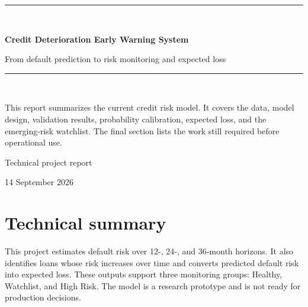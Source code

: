 \documentclass[11pt]{article}
\begin{document}
\hypersetup{pageanchor=false}
\begin{titlepage}
  \centering
  \vspace*{1.2in}
  {\color{Blue}\rule{0.88\textwidth}{2.2pt}}\\[1.1em]
  {\Huge\bfseries\color{Ink}
   Credit Deterioration Early Warning System\par}
  \vspace{0.8em}
  {\Large\color{Muted}From default prediction to risk monitoring and expected loss\par}
  \vspace{1.25em}
  {\color{Gold}\rule{0.42\textwidth}{1.2pt}}\\[2.5em]
  \begin{minipage}{0.80\textwidth}
    \large
    This report summarizes the current credit risk model. It covers the data,
    model design, validation results, probability calibration, expected loss,
    and the emerging-risk watchlist. The final section lists the work still
    required before operational use.
  \end{minipage}
  \vfill
  {\large Technical project report\par}
  {\color{Muted}14 September 2026\par}
  \vspace{0.55in}
\end{titlepage}
\clearpage
\hypersetup{pageanchor=true}

\section*{Technical summary}

This project estimates default risk over 12-, 24-, and 36-month horizons. It also
identifies loans whose risk increases over time and converts predicted default
risk into expected loss. These outputs support three monitoring groups: Healthy,
Watchlist, and High Risk. The model is a research prototype and is not ready for
production decisions.
\end{document}
